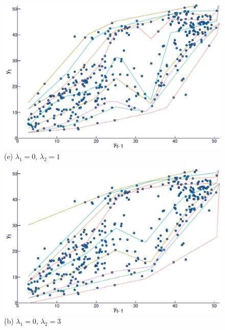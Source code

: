 \begin{figure}[htp]
\begin{minipage}[t]{0.4\linewidth}
\begin{minipage}[b]{\linewidth}
      \centering     \includegraphics[width=\textwidth]{Images/icaraizinho-crossing-1}
      {(e) $\lambda_1 = 0, \, \lambda_2 = 1$}
     \end{minipage}
  \end{minipage}
  \begin{minipage}[t]{0.4\linewidth}
    \centering
    \begin{minipage}[t]{\linewidth}
      \centering     \includegraphics[width=\textwidth]{Images/icaraizinho-crossing-3}
      {(b) $\lambda_1 = 0, \, \lambda_2 = 3$}
    \end{minipage}
    \begin{minipage}[b]{\linewidth}

\end{minipage}
\end{minipage}
\end{figure}
